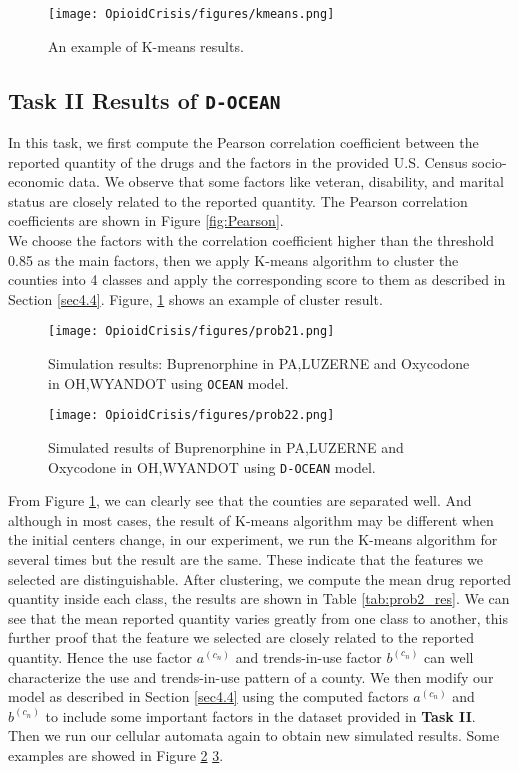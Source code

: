 \documentclass[a4paper]{article}
\begin{document}
\begin{figure}[h]
	\centering  
	\texttt{[image: OpioidCrisis/figures/kmeans.png]} 
	\caption{An example of K-means results.} 
	\label{fig:kmeans}  
\end{figure}

\subsection{\textbf{Task II} Results of \texttt{D-OCEAN}}
In this task, we first compute the Pearson correlation coefficient between the reported quantity of the drugs and the factors in the provided U.S. Census socio-economic data. We observe that some factors like veteran, disability, and marital status are closely related to the reported quantity. The Pearson correlation coefficients are shown in Figure \ref{fig:Pearson}.\\

We choose the factors with the correlation coefficient higher than the threshold 0.85 as the main factors, then we apply K-means algorithm to cluster the counties into 4 classes and apply the corresponding score to them as described in Section \ref{sec4.4}. Figure, \ref{fig:kmeans} shows an example of cluster result.\\

\begin{figure}[h]
	\centering  
	\texttt{[image: OpioidCrisis/figures/prob21.png]} 
	\caption{Simulation results: Buprenorphine in PA,LUZERNE and Oxycodone in OH,WYANDOT using \texttt{OCEAN} model.} 
	\label{fig:prob2a}  
\end{figure}

\begin{figure}[h]
	\centering  
	\texttt{[image: OpioidCrisis/figures/prob22.png]} 
	\caption{Simulated results of Buprenorphine in PA,LUZERNE and Oxycodone in OH,WYANDOT using \texttt{D-OCEAN} model.} 
	\label{fig:prob2b}  
\end{figure}

From Figure \ref{fig:kmeans}, we can clearly see that the counties are separated well. And although in most cases, the result of K-means algorithm may be different when the initial centers change, in our experiment, we run the K-means algorithm for several times but the result are the same. These indicate that the features we selected are distinguishable. After clustering, we compute the mean drug reported quantity inside each class, the results are shown in Table \ref{tab:prob2_res}. We can see that the mean reported quantity varies greatly from one class to another, this further proof that the feature we selected are closely related to the reported quantity. Hence the use factor $a^{(c_n)}$ and trends-in-use factor $b^{(c_n)}$ can well characterize the use and trends-in-use pattern of a county. We then modify our model as described in Section \ref{sec4.4} using the computed factors $a^{(c_n)}$ and $b^{(c_n)}$ to include some important factors in the dataset provided in \textbf{Task II}. Then we run our cellular automata again to obtain new simulated results. Some examples are showed in Figure \ref{fig:prob2a} \ref{fig:prob2b}.\\
\end{document}
